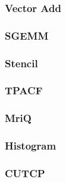 \subsubsection{Vector Add}

\subsubsection{SGEMM}

\subsubsection{Stencil}

\subsubsection{TPACF}

\subsubsection{MriQ}

\subsubsection{Histogram}

\subsubsection{CUTCP}
